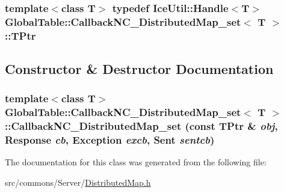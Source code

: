 \label{class_global_table_1_1_callback_n_c___distributed_map__set_ac7f200ec224e006c6471dac69dd79509}
\hypertarget{class_global_table_1_1_callback_n_c___distributed_map__set_aa2cd13e86a05ff06d62c01479a968803}{
\subsubsection[{TPtr}]{\setlength{\rightskip}{0pt plus 5cm}template$<$class T$>$ typedef IceUtil::Handle$<$T$>$ {\bf GlobalTable::CallbackNC\_\-DistributedMap\_\-set}$<$ T $>$::{\bf TPtr}}}
\label{class_global_table_1_1_callback_n_c___distributed_map__set_aa2cd13e86a05ff06d62c01479a968803}


\subsection{Constructor \& Destructor Documentation}
\hypertarget{class_global_table_1_1_callback_n_c___distributed_map__set_aeb63a1a191cf79f85d5ad06aa815b15b}{
\subsubsection[{CallbackNC\_\-DistributedMap\_\-set}]{\setlength{\rightskip}{0pt plus 5cm}template$<$class T$>$ {\bf GlobalTable::CallbackNC\_\-DistributedMap\_\-set}$<$ T $>$::{\bf CallbackNC\_\-DistributedMap\_\-set} (const {\bf TPtr} \& {\em obj}, \/  {\bf Response} {\em cb}, \/  {\bf Exception} {\em excb}, \/  {\bf Sent} {\em sentcb})}}
\label{class_global_table_1_1_callback_n_c___distributed_map__set_aeb63a1a191cf79f85d5ad06aa815b15b}


The documentation for this class was generated from the following file:\begin{DoxyCompactItemize}
\item 
src/commons/Server/\hyperlink{_distributed_map_8h}{DistributedMap.h}\end{DoxyCompactItemize}
